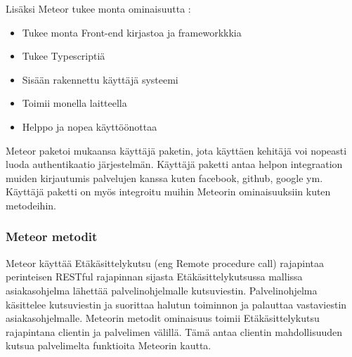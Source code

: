     

Lisäksi Meteor tukee monta ominaisuutta :
\begin{itemize}
    \item Tukee monta Front-end kirjastoa ja frameworkkkia
    \item Tukee Typescriptiä
    \item Sisään rakennettu käyttäjä systeemi
    \item Toimii monella laitteella
    \item Helppo ja nopea käyttöönottaa 
\end{itemize}
\medskip


Meteor paketoi mukaansa käyttäjä paketin, jota käyttäen kehitäjä voi nopeasti luoda authentikaatio järjestelmän.
Käyttäjä paketti antaa helpon integraation muiden kirjautumis palvelujen kanssa kuten facebook, github, google ym.
Käyttäjä paketti on myös integroitu muihin Meteorin ominaisuuksiin kuten metodeihin. 



\subsubsection{Meteor metodit}






Meteor käyttää Etäkäsittelykutsu (eng Remote procedure call) rajapintaa perinteisen RESTful rajapinnan sijasta 
Etäkäsittelykutsussa mallissa asiakasohjelma lähettää palvelinohjelmalle kutsuviestin.
Palvelinohjelma käsittelee kutsuviestin ja suorittaa halutun toiminnon ja palauttaa vastaviestin asiakasohjelmalle.
Meteorin metodit ominaisuus toimii Etäkäsittelykutsu rajapintana clientin ja palvelimen välillä. 
Tämä antaa clientin mahdollisuuden kutsua palvelimelta funktioita Meteorin kautta.
\medskip




